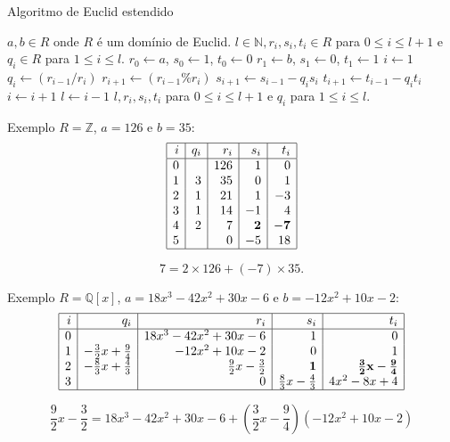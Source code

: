 \documentclass[handout]{beamer}
\newcommand{\ZZ}{\mathbb Z}
\newcommand{\NN}{\mathbb N}
\newcommand{\QQ}{\mathbb Q}
\begin{document}
\begin{frame}[fragile]{Algoritmo de Euclid estendido}
\begin{algorithmic}
\REQUIRE $a,b \in R$ onde $R$ é um domínio de Euclid.
\ENSURE $l\in \NN, r_i,s_i,t_i \in R$ para $0\leq i\leq l+1$ e $q_i\in R$ para $1\leq i \leq l$.
	\STATE $r_0 \leftarrow a$, $s_0 \leftarrow 1$, $t_0\leftarrow 0$
	\STATE $r_1 \leftarrow b$, $s_1 \leftarrow 0$, $t_1\leftarrow 1$
	\STATE $i \leftarrow 1$
		\STATE $q_i \leftarrow (r_{i-1}/ r_i)$
		\STATE $r_{i+1}\leftarrow (r_{i-1}\% r_i)$
		\STATE $s_{i+1}\leftarrow s_{i-1} - q_is_i$
		\STATE $t_{i+1}\leftarrow t_{i-1} - q_it_i$
		\STATE $i\leftarrow i+1$
	\ENDWHILE
	\STATE $l\leftarrow i-1$
	\RETURN $l, r_i, s_i, t_i$ para $0\leq i \leq l+1$ e $q_i$ para $1\leq i \leq l$.
\end{algorithmic}

\end{frame}


\begin{frame}{}
\begin{block}{Exemplo}
$R=\ZZ$, $a=126$ e $b=35$:
$$\begin{array}{|r|r|r|r|r|}\hline
i & q_i & r_i & s_i & t_i \\\hline
0 &   & 126 & 1 &0 \\
1 & 3 & 35 & 0 &1 \\
2 & 1 & 21 & 1 & -3 \\
3 & 1 & 14 & -1 & 4 \\
4 &  2 & 7 & {\bf 2} & {\bf -7} \\
5 &   & 0 & -5 & 18 \\\hline
\end{array}$$
\end{block}
$$7 = 2\times 126 + (-7)\times 35.$$
\end{frame}

\begin{frame}{}
\begin{block}{Exemplo}
$R=\QQ[x]$, $a=18x^3-42x^2+30x-6$ e $b=-12x^2+10x-2$:
$$\begin{array}{|r|r|r|r|r|}\hline
i & q_i                         &               r_i         & s_i                        & t_i \\\hline
0 &                             & 18x^3-42x^2+30x-6         & 1                          & 0 \\
1 & -\frac{3}{2}x + \frac{9}{4} &      -12x^2+10x-2         & 0                          & 1 \\
2 & -\frac{8}{3}x + \frac{4}{3} &  \frac{9}{2}x-\frac{3}{2} &{\bf 1}                     & {\bf \frac{3}{2}x-\frac{9}{4}} \\
3 &                             &                         0 & \frac{8}{3}x - \frac{4}{3} & 4x^2-8x+4 \\\hline 
\end{array}$$
\end{block}
$$ \boxed{\frac{9}{2}x-\frac{3}{2}  = 18x^3-42x^2+30x-6 +  \left(\frac{3}{2}x-\frac{9}{4}\right)\left(-12x^2+10x-2\right)  }$$
\end{frame}
\end{document}
